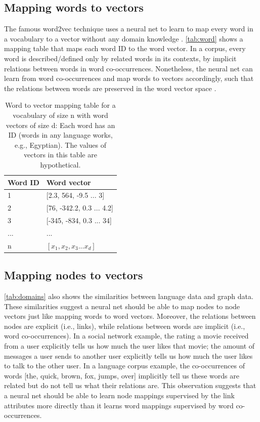 \documentclass{article}
\begin{document}
\subsection{Mapping words to vectors}
The famous word2vec technique uses a neural net to learn to map every word in a 
vocabulary to a vector without any domain knowledge \cite{mikolov2013efficient}.
\autoref{tab:word} shows a mapping table that maps each word ID to the word 
vector.
In a corpus, every word is described/defined only by related words in its 
contexts, by implicit relations between words in word co-occurrences.
Nonetheless, the neural net can learn from word co-occurrences and map words to 
vectors accordingly,
such that the relations between words are preserved in the word vector space 
\cite{mikolov2013distributed}.
\begin{table}[h]
	\centering
	\caption{Word to vector mapping table for a vocabulary of size n with word 
		vectors of size d:
		Each word has an ID (words in any language works, e.g., Egyptian).
		The values of vectors in this table are hypothetical.}
	\begin{tabularx}{0.5\textwidth}{|X|X|} \hline
		\textbf{Word ID} & \textbf{Word vector} \\ \hline
		1 & [2.3, 564, -9.5 ... 3] \\ \hline
		2 & [76, -342.2, 0.3 ... 4.2] \\ \hline
		3 & [-345, -834, 0.3 ... 34] \\ \hline
		... & ... \\ \hline
		n & $ [x_1, x_2, x_3 ... x_d] $ \\ \hline
	\end{tabularx}
	\label{tab:word}
\end{table}

\subsection{Mapping nodes to vectors}
\autoref{tab:domains} also shows the similarities between language data and 
graph data.
These similarities suggest a neural net should be able to map nodes to node 
vectors just like mapping words to word vectors.
Moreover, the relations between nodes are explicit (i.e., links),
while relations between words are implicit (i.e., word co-occurrences).
In a social network example, the rating a movie received from a user explicitly 
tells us how much the user likes that movie;
the amount of messages a user sends to another user explicitly tells us how 
much the user likes to talk to the other user.
In a language corpus example, the co-occurrences of words [the, quick, brown, 
fox, jumps, over] implicitly tell us these words are related but do not tell us 
what their relations are.
This observation suggests that a neural net should be able to learn node 
mappings supervised by the link attributes more directly than it learns word 
mappings supervised by word co-occurrences.
\end{document}
